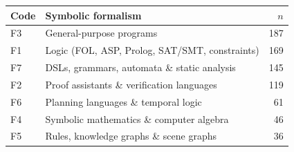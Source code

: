 \begin{tabular}{@{}llr@{}}
\toprule
Code & Symbolic formalism & $n$ \\
\midrule
F3 & General-purpose programs & 187 \\
F1 & Logic (FOL, ASP, Prolog, SAT/SMT, constraints) & 169 \\
F7 & DSLs, grammars, automata \& static analysis & 145 \\
F2 & Proof assistants \& verification languages & 119 \\
F6 & Planning languages \& temporal logic & 61 \\
F4 & Symbolic mathematics \& computer algebra & 46 \\
F5 & Rules, knowledge graphs \& scene graphs & 36 \\
\bottomrule
\end{tabular}
